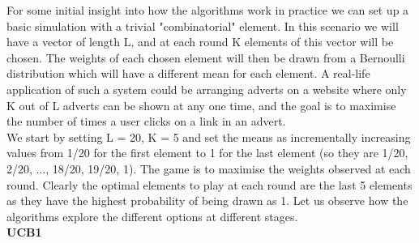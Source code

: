 For some initial insight into how the algorithms work in practice we can set up a basic simulation with a trivial "combinatorial" element. In this scenario we will have a vector of length L, and at each round K elements of this vector will be chosen. The weights of each chosen element will then be drawn from a Bernoulli distribution which will have a different mean for each element. A real-life application of such a system could be arranging adverts on a website where only K out of L adverts can be shown at any one time, and the goal is to maximise the number of times a user clicks on a link in an advert.\\

We start by setting L = 20, K = 5 and set the means as incrementally increasing values from 1/20 for the first element to 1 for the last element (so they are 1/20, 2/20, ..., 18/20, 19/20, 1). The game is to maximise the weights observed at each round. Clearly the optimal elements to play at each round are the last 5 elements as they have the highest probability of being drawn as 1. Let us observe how the algorithms explore the different options at different stages.\\


\noindent \textbf{UCB1}\\

